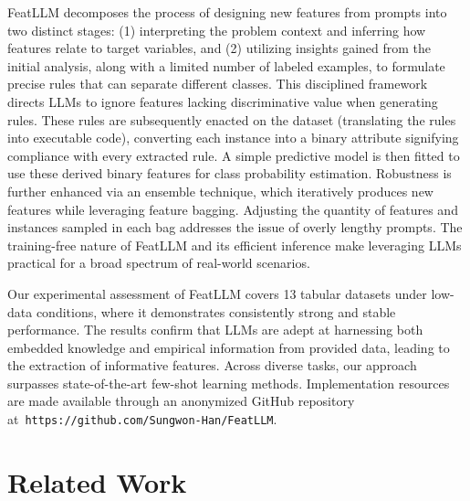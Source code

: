 \textsf{FeatLLM} decomposes the process of designing new features from prompts into two distinct stages: (1) interpreting the problem context and inferring how features relate to target variables, and (2) utilizing insights gained from the initial analysis, along with a limited number of labeled examples, to formulate precise rules that can separate different classes. This disciplined framework directs LLMs to ignore features lacking discriminative value when generating rules. These rules are subsequently enacted on the dataset (translating the rules into executable code), converting each instance into a binary attribute signifying compliance with every extracted rule. A simple predictive model is then fitted to use these derived binary features for class probability estimation. Robustness is further enhanced via an ensemble technique, which iteratively produces new features while leveraging feature bagging. Adjusting the quantity of features and instances sampled in each bag addresses the issue of overly lengthy prompts. The training-free nature of \textsf{FeatLLM} and its efficient inference make leveraging LLMs practical for a broad spectrum of real-world scenarios.

Our experimental assessment of \textsf{FeatLLM} covers 13 tabular datasets under low-data conditions, where it demonstrates consistently strong and stable performance. The results confirm that LLMs are adept at harnessing both embedded knowledge and empirical information from provided data, leading to the extraction of informative features. Across diverse tasks, our approach surpasses state-of-the-art few-shot learning methods. Implementation resources are made available through an anonymized GitHub repository at~\texttt{https://github.com/Sungwon-Han/FeatLLM}.

\section{Related Work}

